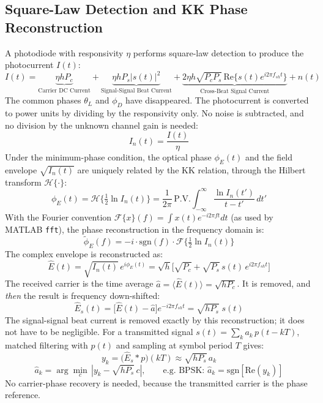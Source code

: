 \subsection{Square-Law Detection and KK Phase Reconstruction}

A photodiode with responsivity $\eta$ performs square-law detection to produce the photocurrent $I(t)$:
\begin{equation}
I(t)=\underbrace{\eta hP_c}_{\text{Carrier DC Current}}+\underbrace{\eta hP_s|s(t)|^2}_{\text{Signal-Signal Beat Current}}+\underbrace{2\eta h\sqrt{P_cP_s}\,\mathrm{Re}\{s(t)e^{i2\pi f_{sh}t}\}}_{\text{Cross-Beat Signal Current}}+n(t)
\end{equation}
The common phases $\theta_L$ and $\phi_D$ have disappeared. The photocurrent is converted to power units by dividing by the responsivity only. No noise is subtracted, and no division by the unknown channel gain is needed:
\begin{equation}
I_n(t)=\frac{I(t)}{\eta}
\end{equation}
Under the minimum-phase condition, the optical phase $\phi_E(t)$ and the field envelope $\sqrt{I_n(t)}$ are uniquely related by the KK relation, through the Hilbert transform $\mathcal H\{\cdot\}$:
\begin{equation}
\phi_E(t)=\mathcal H\Big\{\tfrac12\ln I_n(t)\Big\}=\frac{1}{2\pi}\,\mathrm{P.V.}\!\int_{-\infty}^{\infty}\frac{\ln I_n(t')}{t-t'}\,dt'
\end{equation}
With the Fourier convention $\mathcal F\{x\}(f)=\int x(t)e^{-i2\pi ft}dt$ (as used by MATLAB \texttt{fft}), the phase reconstruction in the frequency domain is:
\begin{equation}
\tilde\phi_E(f)=-i\cdot\mathrm{sgn}(f)\cdot\mathcal F\Big\{\tfrac12\ln I_n(t)\Big\}
\end{equation}
The complex envelope is reconstructed as:
\begin{equation}
\hat E(t)=\sqrt{I_n(t)}\,e^{i\phi_E(t)}=\sqrt h\Big[\sqrt{P_c}+\sqrt{P_s}\,s(t)\,e^{i2\pi f_{sh}t}\Big]
\end{equation}
The received carrier is the time average $\hat a=\langle\hat E(t)\rangle=\sqrt{hP_c}$. It is removed, and \emph{then} the result is frequency down-shifted:
\begin{equation}
\hat E_s(t)=\big[\hat E(t)-\hat a\big]e^{-i2\pi f_{sh}t}=\sqrt{hP_s}\;s(t)
\end{equation}
The signal-signal beat current is removed exactly by this reconstruction; it does not have to be negligible. For a transmitted signal $s(t)=\sum_k a_k\,p(t-kT)$, matched filtering with $p(t)$ and sampling at symbol period $T$ gives:
\begin{equation}
y_k=\big(\hat E_s\ast p\big)(kT)\approx\sqrt{hP_s}\,a_k
\end{equation}
\begin{equation}
\hat a_k=\arg\min_{c}\,|y_k-\sqrt{hP_s}\,c|,\qquad \text{e.g. BPSK: }\hat a_k=\mathrm{sgn}[\mathrm{Re}(y_k)]
\end{equation}
No carrier-phase recovery is needed, because the transmitted carrier is the phase reference.

